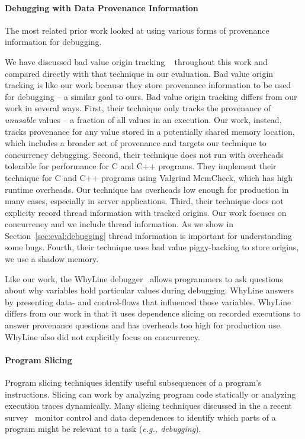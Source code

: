 \documentclass[preprint,9pt]{sigplanconf}
\begin{document}
\paragraph{Debugging with Data Provenance Information}
The most related prior work looked at using various forms of provenance information for debugging.

We have discussed bad value origin tracking ~\cite{badapples} throughout this
work and compared directly with that technique in our evaluation.  Bad value
origin tracking is like our work because they store provenance information to
be used for debugging -- a similar goal to ours.  Bad value origin tracking
differs from our work in several ways.  First, their technique only tracks the
provenance of {\em unusable} values -- a fraction of all values in an
execution.  Our work, instead, tracks provenance for any value stored in a
potentially shared memory location, which includes a broader set of provenance
and targets our technique to concurrency debugging.  Second, their technique
does not run with overheads tolerable for performance for C and C++ programs.
They implement their technique for C and C++ programs using Valgrind MemCheck,
which has high runtime overheads.  Our technique has overheads low enough for
production in many cases, especially in server applications.  Third, their
technique does not explicity record thread information with tracked origins.
Our work focuses on concurrency and we include thread information.  As we show
in Section~\ref{sec:eval:debugging} thread information is important for
understanding some bugs.  Fourth, their technique uses bad value piggy-backing
to store origins, we use a shadow memory.

Like our work, the WhyLine debugger~\cite{whylineicse, whylinechi} allows
programmers to ask questions about why variables hold particular values during
debugging.  WhyLine answers by presenting data- and control-flows that
influenced those variables.  WhyLine differs from our work in that it uses
dependence slicing on recorded executions to answer provenance questions and
has overheads too high for production use.  WhyLine also did not explicitly
focus on concurrency.


\paragraph{Program Slicing}
Program slicing techniques identify useful subsequences of a program's
instructions.   Slicing can work by analyzing program code statically or
analyzing execution traces dynamically.  Many slicing techniques discussed in
the a recent survey~\cite{tipslicingsurvey} monitor control and data
dependences to identify which parts of a program might be relevant to a task
({\em e.g., debugging}).
\end{document}
